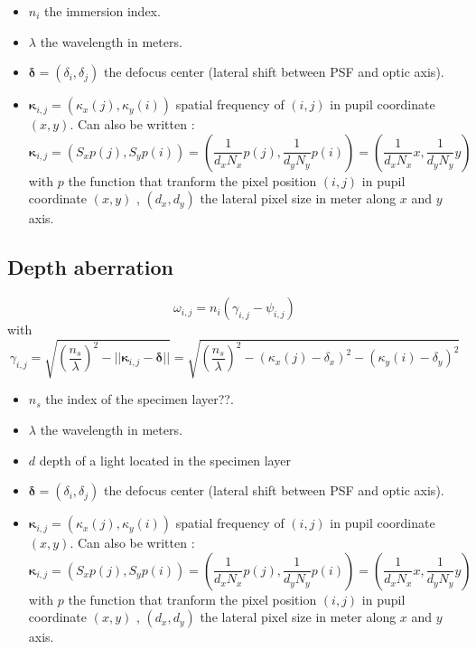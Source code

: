 \documentclass[a4paper]{article}
\begin{document}
\begin{itemize}
\item $n_i$ the immersion index.
\item $\lambda$ the wavelength in meters.
\item $\boldsymbol{\delta} = (\delta_i, \delta_j)$ the defocus center (lateral shift between PSF and optic axis).
\item $\boldsymbol{\kappa}_{i,j} = (\kappa_x(j), \kappa_y(i))$ spatial frequency of $(i,j)$ in pupil coordinate $(x,y)$. Can also be written :
$$
\boldsymbol{\kappa}_{i,j}= (S_x p(j),S_y p(i)) = (\frac{1}{d_{x}N_x} p(j), \frac{1}{d_{y}N_y} p(i)) = (\frac{1}{d_{x}N_x} x, \frac{1}{d_{y}N_y} y)$$ with $p$ the function that tranform the pixel position $(i,j)$ in pupil coordinate $(x,y)$ , $(d_x,d_y)$ the lateral pixel size in meter along $x$ and $y$ axis.
\end{itemize}

\subsection{Depth aberration}
\label{Depth aberration}
\begin{equation}
\omega_{i,j} = n_i(\gamma_{i,j} - \psi_{i,j})
\end{equation}
with 
\begin{equation}
\gamma_{i,j} = \sqrt{\left(\frac{n_s}{\lambda}\right)^2 - ||\boldsymbol{\kappa}_{i,j} - \boldsymbol{\delta}||} =
\sqrt{\left(\frac{n_s}{\lambda}\right)^2 - (\kappa_x(j) - \delta_x)^2 -  (\kappa_y(i) - \delta_y)^2}
\end{equation}
\begin{itemize}
\item $n_s$ the index of the specimen layer??.
\item $\lambda$ the wavelength in meters.
\item $d$  depth of a light located in the specimen layer
\item $\boldsymbol{\delta} = (\delta_i, \delta_j)$ the defocus center (lateral shift between PSF and optic axis).
\item $\boldsymbol{\kappa}_{i,j} = (\kappa_x(j), \kappa_y(i))$ spatial frequency of $(i,j)$ in pupil coordinate $(x,y)$. Can also be written :
$$
\boldsymbol{\kappa}_{i,j}= (S_x p(j),S_y p(i)) = (\frac{1}{d_{x}N_x} p(j), \frac{1}{d_{y}N_y} p(i)) = (\frac{1}{d_{x}N_x} x, \frac{1}{d_{y}N_y} y)$$ with $p$ the function that tranform the pixel position $(i,j)$ in pupil coordinate $(x,y)$ , $(d_x,d_y)$ the lateral pixel size in meter along $x$ and $y$ axis.
\end{itemize}
\end{document}
